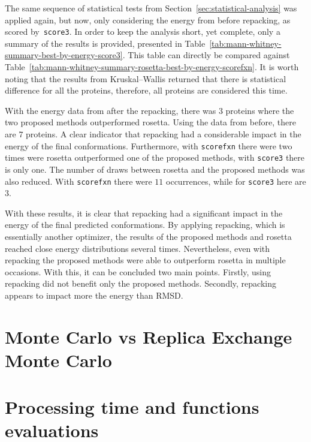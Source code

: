 The same sequence of statistical tests from
Section~\ref{sec:statistical-analysis} was applied again, but now, only
considering the energy from before repacking, as scored by~\texttt{score3}.
In order to keep the analysis short, yet complete, only a summary of the
results is provided, presented in
Table~\ref{tab:mann-whitney-summary-best-by-energy-score3}. This table can
directly be compared against
Table~\ref{tab:mann-whitney-summary-rosetta-best-by-energy-scorefxn}.
It is worth noting that the results from Kruskal–Wallis returned that there is
statistical difference for all the proteins, therefore, all proteins are
considered this time.

With the energy data from after the repacking, there was $3$ proteins where the
two proposed methods outperformed rosetta. Using the data from before, there are
$7$ proteins. A clear indicator that repacking had a considerable impact in the
energy of the final conformations. Furthermore, with \texttt{scorefxn} there
were two times were rosetta outperformed one of the proposed methods, with
\texttt{score3} there is only one. The number of draws between rosetta and the
proposed methods was also reduced. With \texttt{scorefxn} there were $11$
occurrences, while for \texttt{score3} here are $3$.

With these results, it is clear that repacking had a significant impact in the
energy of the final predicted conformations. By applying repacking, which is
essentially another optimizer, the results of the proposed methods and rosetta
reached close energy distributions several times. Nevertheless, even with
repacking the proposed methods were able to outperform rosetta in multiple
occasions. With this, it can be concluded two main points. Firstly, using
repacking did not benefit only the proposed methods. Secondly, repacking
appears to impact more the energy than RMSD.

\section{Monte Carlo vs Replica Exchange Monte Carlo}

\section{Processing time and functions evaluations} \label{sec:time-and-evals}

